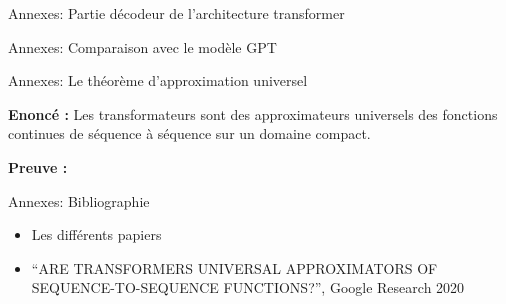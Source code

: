 \documentclass[12pt]{beamer}
\begin{document}
\begin{frame}{Annexes: Partie décodeur de l'architecture transformer}



\end{frame}




\begin{frame}{Annexes: Comparaison avec le modèle GPT}



\end{frame}






\begin{frame}{Annexes: Le théorème d'approximation universel}

\textbf{Enoncé :}
Les transformateurs sont des approximateurs universels des fonctions continues de séquence à séquence sur un domaine compact.

\textbf{Preuve :}



\end{frame}





\begin{frame}{Annexes: Bibliographie}

\begin{itemize}
	\item Les différents papiers 
	\item ``ARE TRANSFORMERS UNIVERSAL APPROXIMATORS
OF SEQUENCE-TO-SEQUENCE FUNCTIONS?'', Google Research 2020
\end{itemize}

\end{frame}
\end{document}
